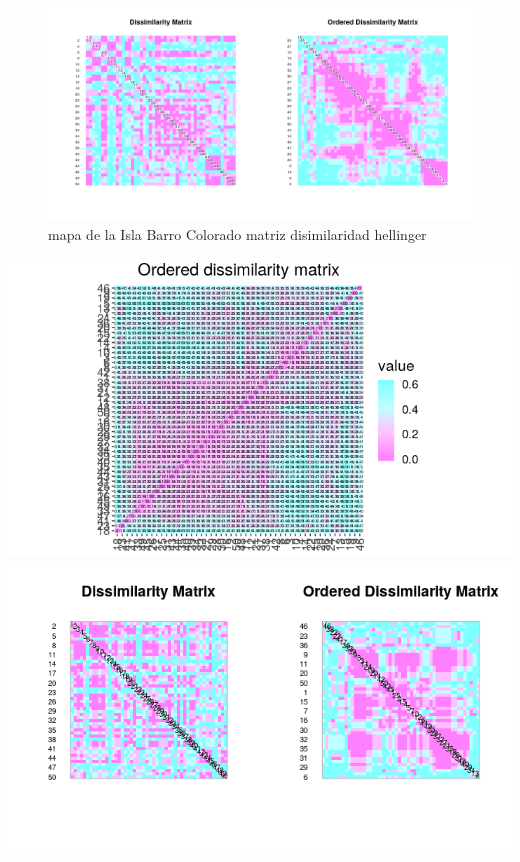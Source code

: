 \documentclass[11pt,]{article}
\begin{document}
\begin{figure}
\centering
\includegraphics[width=1.00000\textwidth]{matriz_disimilaridad_hellinger.png}
\caption{mapa de la Isla Barro Colorado matriz disimilaridad hellinger
\label{fig:bci_map}}
\end{figure}

\includegraphics[width=1.00000\textwidth]{matrizdedisimilaridad.png}
\includegraphics[width=1.00000\textwidth]{matriz_similaridad.png}
\end{document}
